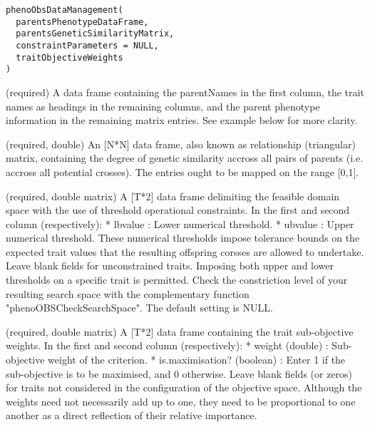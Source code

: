 \documentclass[a4paper]{book}
\begin{document}
%
\begin{Usage}
\begin{verbatim}
phenoObsDataManagement(
  parentsPhenotypeDataFrame,
  parentsGeneticSimilarityMatrix,
  constraintParameters = NULL,
  traitObjectiveWeights
)
\end{verbatim}
\end{Usage}
%
\begin{Arguments}
\begin{ldescription}
\item[\code{parentsPhenotypeDataFrame}] (required) A data frame containing the parentNames in the first column, the trait names as headings in the remaining columns, and the parent phenotype information in the remaining matrix entries.
See example below for more clarity.

\item[\code{parentsGeneticSimilarityMatrix}] (required, double) An [N*N] data frame, also known as relationship (triangular) matrix, containing the degree of genetic similarity accross all pairs of parents (i.e. accross all potential crosses).
The entries ought to be mapped on the range [0,1].

\item[\code{constraintParameters}] (required, double matrix) A [T*2] data frame delimiting the feasible domain space with 
the use of threshold operational constraints. In the first and second column (respectively):
* lbvalue : Lower numerical threshold.
* ubvalue : Upper numerical threshold.
These numerical thresholds impose tolerance bounds on the expected trait values that the resulting offspring corsses are allowed to undertake.
Leave blank fields for unconstrained traits.
Imposing both upper and lower thresholds on a specific trait is permitted.
Check the constriction level of your resulting search space with the complementary function "phenoOBSCheckSearchSpace".
The default setting is NULL.

\item[\code{traitObjectiveWeights}] (required, double matrix) A [T*2] data frame containing the trait sub-objective weights.
In the first and second column (respectively):
* weight (double) : Sub-objective weight of the criterion.
* is.maximisation? (boolean) : Enter 1 if the sub-objective is to be maximised, and 0 otherwise.
Leave blank fields (or zeros) for traits not considered in the configuration of the objective space.
Although the weights need not necessarily add up to one, they need to be proportional to one another as a direct reflection of their relative importance.
\end{ldescription}
\end{Arguments}
\end{document}

